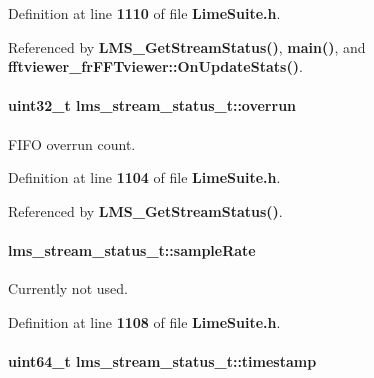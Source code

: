 Definition at line {\bf 1110} of file {\bf Lime\+Suite.\+h}.



Referenced by {\bf L\+M\+S\+\_\+\+Get\+Stream\+Status()}, {\bf main()}, and {\bf fftviewer\+\_\+fr\+F\+F\+Tviewer\+::\+On\+Update\+Stats()}.

\paragraph[{overrun}]{\setlength{\rightskip}{0pt plus 5cm}uint32\+\_\+t lms\+\_\+stream\+\_\+status\+\_\+t\+::overrun}\label{structlms__stream__status__t_a130e766b4b196781014c9e9f528a35bc}


F\+I\+FO overrun count. 



Definition at line {\bf 1104} of file {\bf Lime\+Suite.\+h}.



Referenced by {\bf L\+M\+S\+\_\+\+Get\+Stream\+Status()}.

\paragraph[{sample\+Rate}]{ lms\+\_\+stream\+\_\+status\+\_\+t\+::sample\+Rate}\label{structlms__stream__status__t_a71aaae6b50c72f33c985168885ff7648}


Currently not used. 



Definition at line {\bf 1108} of file {\bf Lime\+Suite.\+h}.

\paragraph[{timestamp}]{\setlength{\rightskip}{0pt plus 5cm}uint64\+\_\+t lms\+\_\+stream\+\_\+status\+\_\+t\+::timestamp}\label{structlms__stream__status__t_a08832cf2b226f61d54558219371e5b10}



